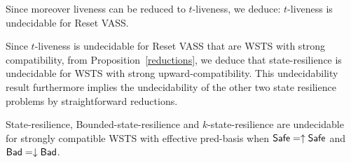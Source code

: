 Since moreover liveness can be reduced to 
$t$-liveness, we deduce:
\fi
%
$t$-liveness is undecidable for Reset VASS.



\iffalse

\begin{theorem}
The downward reachability problem is reducible to the state resilience problem.
\end{theorem}

\begin{proof}
Let $s \in S$, and a downward-closed set $D$. \alain{je ne comprends pas cette "preuve"}
Take $\Safe = \emptyset$ and $\Bad = D$.
The state resilience problem on $\Safe,\Bad$ asks
whether $\Bad \cap \post^*(s) \rightarrow^* \Safe$  that is equivalent to $\Bad \cap \post^*(s) \subseteq \emptyset$.
If the answer is negative then $s \to^* \Bad$,
else $s \not\to^* \Bad$.
\end{proof}

\fi


Since $t$-liveness is undecidable for Reset VASS that are WSTS with strong compatibility, from Proposition~\ref{reductions},  we deduce that state-resilience is undecidable for WSTS with strong upward-compatibility. This undecidability result furthermore implies the undecidability of the other two state resilience problems by straightforward reductions.


\begin{theorem}\label{srp up down}
{\sc State-resilience},
{\sc Bounded-state-resilience} and
{\sc $k$-state-resilience}
are undecidable for strongly compatible WSTS with effective pred-basis
when
$\textsf{Safe}=\uparrow \textsf{Safe}$
and $\textsf{Bad}=\downarrow \textsf{Bad}$.
\end{theorem}


